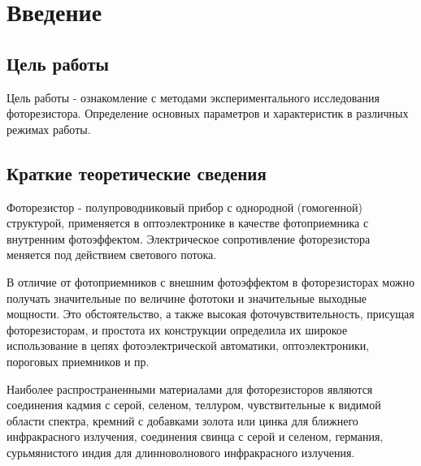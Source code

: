 \section{Введение}

\subsection{Цель работы}

Цель работы - ознакомление с методами экспериментального исследования фоторезистора. Определение основных параметров и характеристик в различных режимах работы.


\subsection{Краткие теоретические сведения}

Фоторезистор - полупроводниковый прибор с однородной
(гомогенной) структурой, применяется в оптоэлектронике в качестве фотоприемника с внутренним фотоэффектом. Электрическое сопротивление фоторезистора меняется под действием светового потока.

В отличие от фотоприемников с внешним фотоэффектом в фоторезисторах можно получать значительные по величине фототоки и значительные выходные мощности. Это обстоятельство, а также высокая фоточувствительность, присущая фоторезисторам, и простота их конструкции определила их широкое использование в цепях фотоэлектрической автоматики, оптоэлектроники, пороговых приемников и пр.

Наиболее распространенными материалами для фоторезисторов являются соединения кадмия с серой, селеном, теллуром, чувствительные к видимой области спектра, кремний с добавками золота или цинка для ближнего инфракрасного излучения, соединения свинца с серой и селеном, германия, сурьмянистого индия для длинноволнового инфракрасного излучения.